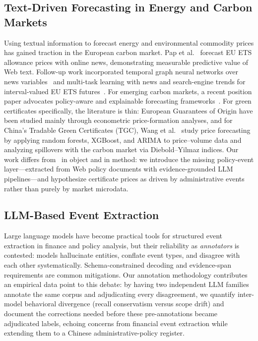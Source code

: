 \documentclass[sigconf,anonymous,review]{acmart}
\begin{document}
\subsection{Text-Driven Forecasting in Energy and Carbon Markets}
Using textual information to forecast energy and environmental commodity prices has gained traction in the European carbon market. Pap et al.~\cite{hartvig2024eunews} forecast EU ETS allowance prices with online news, demonstrating measurable predictive value of Web text. Follow-up work incorporated temporal graph neural networks over news variables~\cite{textgnn2025carbon} and multi-task learning with news and search-engine trends for interval-valued EU ETS futures~\cite{multitask2025carbon}. For emerging carbon markets, a recent position paper advocates policy-aware and explainable forecasting frameworks~\cite{policyaware2026}. For green certificates specifically, the literature is thin: European Guarantees of Origin have been studied mainly through econometric price-formation analyses, and for China's Tradable Green Certificates (TGC), Wang et al.~\cite{wang2025tgc} study price forecasting by applying random forests, XGBoost, and ARIMA to price--volume data and analyzing spillovers with the carbon market via Diebold--Yilmaz indices. Our work differs from~\cite{wang2025tgc} in object and in method: we introduce the missing policy-event layer---extracted from Web policy documents with evidence-grounded LLM pipelines---and hypothesize certificate prices as driven by administrative events rather than purely by market microdata.

\subsection{LLM-Based Event Extraction}
Large language models have become practical tools for structured event extraction in finance and policy analysis, but their reliability as \emph{annotators} is contested: models hallucinate entities, conflate event types, and disagree with each other systematically. Schema-constrained decoding and evidence-span requirements are common mitigations. Our annotation methodology contributes an empirical data point to this debate: by having two independent LLM families annotate the same corpus and adjudicating every disagreement, we quantify inter-model behavioral divergence (recall conservatism versus scope drift) and document the corrections needed before these pre-annotations became adjudicated labels, echoing concerns from financial event extraction while extending them to a Chinese administrative-policy register.
\end{document}
